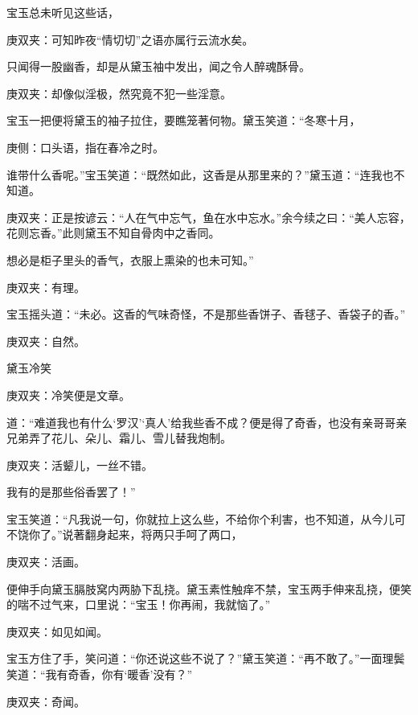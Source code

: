 \begin{parag}
    宝玉总未听见这些话，\begin{note}庚双夹：可知昨夜“情切切”之语亦属行云流水矣。\end{note}只闻得一股幽香，却是从黛玉袖中发出，闻之令人醉魂酥骨。\begin{note}庚双夹：却像似淫极，然究竟不犯一些淫意。\end{note}宝玉一把便将黛玉的袖子拉住，要瞧笼著何物。黛玉笑道：“冬寒十月，\begin{note}庚侧：口头语，指在春冷之时。\end{note}谁带什么香呢。”宝玉笑道：“既然如此，这香是从那里来的？”黛玉道：“连我也不知道。\begin{note}庚双夹：正是按谚云：“人在气中忘气，鱼在水中忘水。”余今续之曰：“美人忘容，花则忘香。”此则黛玉不知自骨肉中之香同。\end{note}想必是柜子里头的香气，衣服上熏染的也未可知。”\begin{note}庚双夹：有理。\end{note}宝玉摇头道：“未必。这香的气味奇怪，不是那些香饼子、香毬子、香袋子的香。”\begin{note}庚双夹：自然。\end{note}黛玉冷笑\begin{note}庚双夹：冷笑便是文章。\end{note}道：“难道我也有什么‘罗汉’‘真人’给我些香不成？便是得了奇香，也没有亲哥哥亲兄弟弄了花儿、朵儿、霜儿、雪儿替我炮制。\begin{note}庚双夹：活颦儿，一丝不错。\end{note}我有的是那些俗香罢了！”
\end{parag}


\begin{parag}
    宝玉笑道：“凡我说一句，你就拉上这么些，不给你个利害，也不知道，从今儿可不饶你了。”说著翻身起来，将两只手呵了两口，\begin{note}庚双夹：活画。\end{note}便伸手向黛玉膈肢窝内两胁下乱挠。黛玉素性触痒不禁，宝玉两手伸来乱挠，便笑的喘不过气来，口里说：“宝玉！你再闹，我就恼了。”\begin{note}庚双夹：如见如闻。\end{note}宝玉方住了手，笑问道：“你还说这些不说了？”黛玉笑道：“再不敢了。”一面理鬓笑道：“我有奇香，你有‘暖香’没有？”\begin{note}庚双夹：奇闻。\end{note}
\end{parag}


